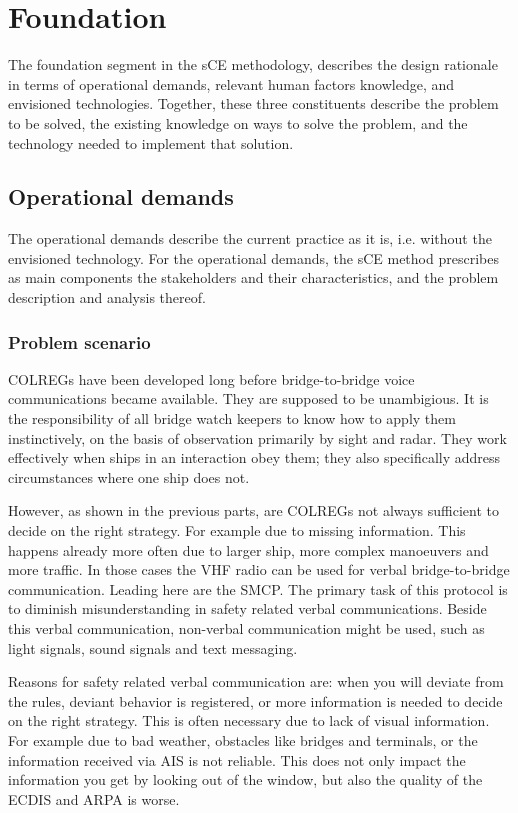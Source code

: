 \chapter{Foundation}
The foundation segment in the \acf{sCE} methodology, describes the design rationale in terms of operational demands, relevant human factors knowledge, and envisioned technologies. Together, these three constituents describe the problem to be solved, the existing knowledge on ways to solve the problem, and the technology needed to implement that solution.

\section{Operational demands}
The operational demands describe the current practice as it is, i.e. without the envisioned technology. For the operational demands, the sCE method prescribes as main components the stakeholders and their characteristics, and the problem description and analysis thereof.

\subsection{Problem scenario}
\acf{COLREGs} have been developed long before bridge-to-bridge voice communications became available. They are supposed to be unambigious. It is the responsibility of all bridge watch keepers to know how to apply them instinctively, on the basis of observation primarily by sight and radar. They work effectively when ships in an interaction obey them; they also specifically address circumstances where one ship does not.

However, as shown in the previous parts, are \ac{COLREGs} not always sufficient to decide on the right strategy. For example due to missing information. This happens already more often due to larger ship, more complex manoeuvers and more traffic. In those cases the \ac{VHF} radio can be used for verbal bridge-to-bridge communication. Leading here are the \acf{SMCP}. The primary task of this protocol is to diminish misunderstanding in safety related verbal communications. 
Beside this verbal communication, non-verbal communication might be used, such as light signals, sound signals and text messaging.

Reasons for safety related verbal communication are: when you will deviate from the rules, deviant behavior is registered, or more information is needed to decide on the right strategy. This is often necessary due to lack of visual information. For example due to bad weather, obstacles like bridges and terminals, or the information received via \acf{AIS} is not reliable. This does not only impact the information you get by looking out of the window, but also the quality of the \acf{ECDIS} and \acf{ARPA} is worse.

